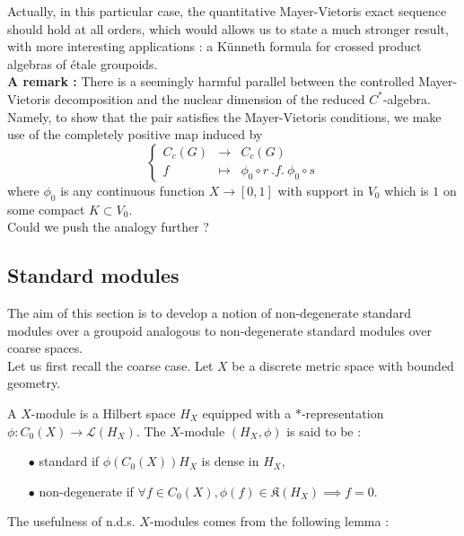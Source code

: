 Actually, in this particular case, the quantitative Mayer-Vietoris exact sequence should hold at all orders, which would allows us to state a much stronger result, with more interesting applications : a Künneth formula for crossed product algebras of étale groupoids.\\

\textbf{A remark :} There is a seemingly harmful parallel between the controlled Mayer-Vietoris decomposition and the nuclear dimension of the reduced $C^*$-algebra. Namely, to show that the pair satisfies the Mayer-Vietoris conditions, we make use of the completely positive map induced by 
\[\left\{\begin{array}{lcr} C_c(G) &\rightarrow & C_c(G) \\ f &\mapsto & \phi_0\circ r\ . f .\ \phi_0\circ s\end{array}\right.\]   
where $\phi_0$ is any continuous function $X\rightarrow [0,1]$ with support in $V_0$ which is $1$ on some compact $K\subset V_0$.\\
Could we push the analogy further ? 

\subsection{Standard modules}

The aim of this section is to develop a notion of non-degenerate standard modules over a groupoid analogous to non-degenerate standard modules over coarse spaces. \\

Let us first recall the coarse case. Let $X$ be a discrete metric space with bounded geometry. 

\begin{definition}
A $X$-module is a Hilbert space $H_X$ equipped with a $*$-representation $\phi : C_0(X) \rightarrow \mathcal L(H_X)$. The $X$-module $(H_X,\phi)$ is said to be :\\

\begin{itemize}
\item[$\bullet$] standard if $\phi(C_0(X))H_X$ is dense in $H_X$,
\item[$\bullet$] non-degenerate if $\forall f \in C_0(X), \phi(f)\in \mathfrak K (H_X) \implies f=0$.
\end{itemize}
\end{definition}

The usefulness of n.d.s. $X$-modules comes from the following lemma :

